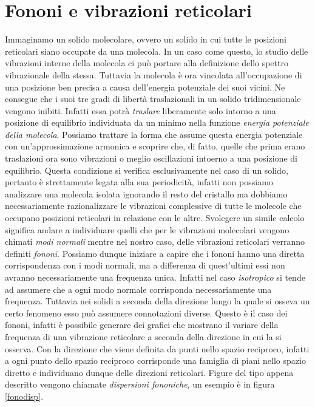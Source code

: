 \documentclass[oneside]{amsbook}
\numberwithin{section}{chapter}
\numberwithin{equation}{section}
\numberwithin{figure}{section}
\begin{document}
\section{Fononi e vibrazioni reticolari}
Immaginamo un solido molecolare, ovvero un solido in cui tutte le posizioni reticolari siano occupate da una molecola. In un caso come questo, lo studio delle vibrazioni interne della molecola ci può portare alla definizione dello spettro vibrazionale della stessa. Tuttavia la molecola è ora vincolata all'occupazione di una posizione ben precisa a causa dell'energia potenziale dei suoi vicini. Ne consegue che i suoi tre gradi di libertà traslazionali in un solido tridimensionale vengono inibiti. Infatti essa potrà \emph{traslare} liberamente solo intorno a una posizione di equilibrio individuata da un minimo nella funzione \emph{energia potenziale della molecola}. Possiamo trattare la forma che assume questa energia potenziale con un'approssimazione armonica e scoprire che, di fatto, quelle che prima erano traslazioni ora sono vibrazioni o meglio oscillazioni intoerno a una posizione di equilibrio.
Questa condizione si verifica esclusivamente nel caso di un solido, pertanto è strettamente legata alla sua periodicità, infatti non possiamo analizzare una molecola isolata ignorando il resto del cristallo ma dobbiamo necessariamente razionalizzare le vibrazioni complessive di tutte le molecole che occupano posizioni reticolari in relazione con le altre.
Svolegere un simile calcolo significa andare a individuare quelli che per le vibrazioni molecolari vengono chimati \emph{modi normali} mentre nel nostro caso, delle vibrazioni reticolari verranno definiti \emph{fononi}. Possiamo dunque iniziare a capire che i fononi hanno una diretta corrispondenza con i modi normali, ma a differenza di quest'ultimi essi non avranno necessariamente una frequenza unica. Infatti nel caso \emph{isotropico} si tende ad assumere che a ogni modo normale corrisponda necessariamente una frequenza. Tuttavia nei solidi a seconda della direzione lungo la quale si osseva un certo fenomeno esso può assumere connotazioni diverse. Questo è il caso dei fononi, infatti è possibile generare dei grafici che mostrano il variare della frequenza di una vibrazione reticolare a seconda della direzione in cui la si osserva. Con la direzione che viene definita da punti nello spazio reciproco, infatti a ogni punto dello spazio reciproco corrisponde una famiglia di piani nello spazio diretto e individuano dunque delle direzioni reticolari. Figure del tipo appena descritto vengono chiamate \emph{dispersioni fononiche}, un esempio è in figura \ref{fonodisp}.
\end{document}
